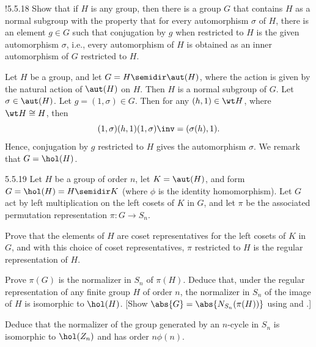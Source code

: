 \begin{exercise}!{5.5.18}
    Show that if $H$ is any group, then there is a group $G$ that contains $H$ as a normal subgroup with the property that for every automorphism $\sigma$ of $H$, there is an element $g \in G$ such that conjugation by $g$ when restricted to $H$ is the given automorphism $\sigma$, i.e., every automorphism of $H$ is obtained as an inner automorphism of $G$ restricted to $H$.
\end{exercise}

\begin{sol}
    Let $H$ be a group, and let $G = H \semidir \aut(H)$, where the action is given by the natural action of $\aut(H)$ on $H$.
	Then $H$ is a normal subgroup of $G$.
	Let $\sigma \in \aut(H)$.
	Let $g = (1, \sigma) \in G$.
	Then for any $(h, 1) \in \wt H$, where $\wt H \cong H$, then
    \[
    	(1, \sigma)(h, 1)(1, \sigma)\inv = ( \sigma(h), 1).
    \]
    Hence, conjugation by $g$ restricted to $H$ gives the automorphism $\sigma$.
	We remark that $G = \hol(H)$.
\end{sol}

\begin{exercise}{5.5.19}
    Let $H$ be a group of order $n$, let $K = \aut(H)$, and form $G = \hol(H) = H \semidir K$ (where $\phi$ is the identity homomorphism).
	Let $G$ act by left multiplication on the left cosets of $K$ in $G$, and let $\pi$ be the associated permutation representation $\pi \colon G \to S_n$.
    \begin{subexercises}
        \item Prove that the elements of $H$ are coset representatives for the left cosets of $K$ in $G$, and with this choice of coset representatives, $\pi$ restricted to $H$ is the regular representation of $H$.
        \item Prove $\pi(G)$ is the normalizer in $S_n$ of $\pi(H)$.
	    Deduce that, under the regular representation of any finite group $H$ of order $n$, the normalizer in $S_n$ of the image of $H$ is isomorphic to $\hol(H)$. [Show $\abs{G} = \abs{N_{S_n}(\pi(H))}$ using  and .]
        \item Deduce that the normalizer of the group generated by an $n$-cycle in $S_n$ is isomorphic to $\hol(Z_n)$ and has order $n\phi(n)$.
    \end{subexercises}
\end{exercise}

